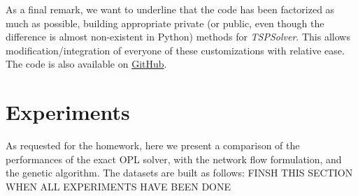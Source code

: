 \documentclass{article}
\begin{document}
As a final remark, we want to underline that the code has been factorized as much as possible, building appropriate private (or public, even though the difference is almost non-existent in Python) methods for \textit{TSPSolver}. This allows modification/integration of everyone of these customizations with relative ease. The code is also available on \href{https://github.com/NRuggeriProjects/Combinatorial-Optimization}{GitHub}.





\section{Experiments}\label{sec:experiments}
As requested for the homework, here we present a comparison of the performances of the exact OPL solver, with the network flow formulation, and the genetic algorithm. The datasets are built as follows: 
FINSH THIS SECTION WHEN ALL EXPERIMENTS HAVE BEEN DONE















\newpage


\end{document}
